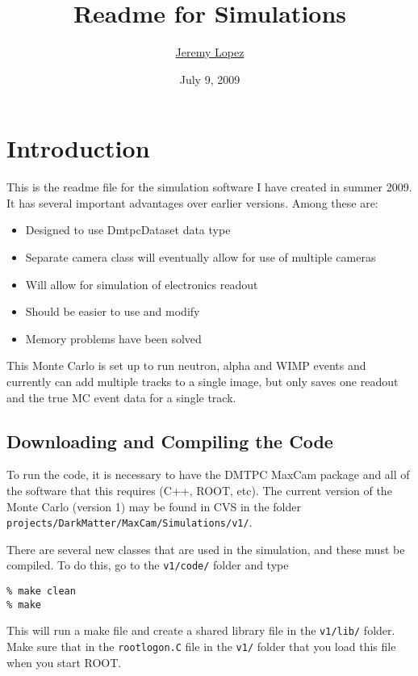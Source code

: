 \documentclass[12pt]{article}
\title{Readme for Simulations}
\author{\href{mailto:jplopez@mit.edu}{Jeremy Lopez}}
\date{July 9, 2009}
\begin{document}
\maketitle

\newpage

\tableofcontents

\newpage
\section{Introduction}

This is the readme file for the simulation software I have created in summer 2009.  It has several important advantages over earlier versions.  Among these are:
\begin{itemize}
  \item Designed to use DmtpcDataset data type
  \item Separate camera class will eventually allow for use of multiple cameras
  \item Will allow for simulation of electronics readout
  \item Should be easier to use and modify
  \item Memory problems have been solved
\end{itemize}
This Monte Carlo is set up to run neutron, alpha and WIMP events and currently can add multiple tracks to a single image, but only saves one readout and the 
true MC event data for a single track.

\subsection{Downloading and Compiling the Code}

To run the code, it is necessary to have the DMTPC MaxCam package and all of the software that this requires (C++, ROOT, etc).
The current version of the Monte Carlo (version 1) may be found in CVS in the folder \verb|projects/DarkMatter/MaxCam/Simulations/v1/|.

There are several new classes that are used in the simulation, and these must be compiled.  To do this, go to the \verb|v1/code/| folder and type
\begin{verbatim}
% make clean
% make
\end{verbatim}
This will run a make file and create a shared library file in the \verb|v1/lib/| folder.  Make sure that in the \verb|rootlogon.C| file in the \verb|v1/| folder
that you load this file when you start ROOT.
\end{document}
